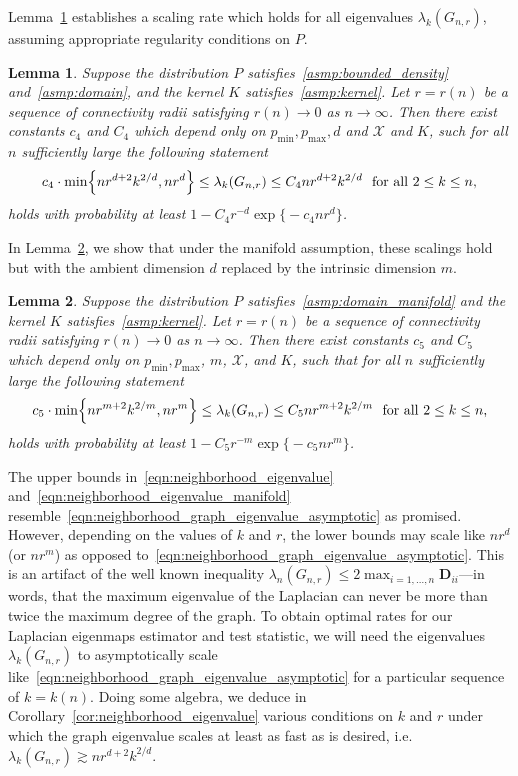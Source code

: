 \documentclass{article}
\newcommand{\1}{\mathbf{1}}
\newcommand{\Xset}{\mathcal{X}}
\theoremstyle{alden}
\theoremstyle{aldenthm}
\newtheorem{lemma}{Lemma}
\theoremstyle{definition}
\theoremstyle{remark}
\begin{document}
Lemma~\ref{lem:neighborhood_eigenvalue} establishes a scaling rate which holds for all eigenvalues $\lambda_{k}(G_{n,r})$, assuming appropriate regularity conditions on $P$.
\begin{lemma}
	\label{lem:neighborhood_eigenvalue}
	Suppose the distribution $P$ satisfies~\ref{asmp:bounded_density} and~\ref{asmp:domain}, and the kernel $K$ satisfies~\ref{asmp:kernel}. Let $r = r(n)$ be a sequence of connectivity radii satisfying $r(n) \to 0$ as $n \to \infty$. Then there exist constants $c_4$ and $C_4$ which depend only on $p_{\min}, p_{\max},d$ and $\Xset$ and $K$, such for all $n$ sufficiently large the following statement
	\begin{equation}
	\label{eqn:neighborhood_eigenvalue}
	c_4 \cdot \min\Bigl\{nr^{d + 2}k^{2/d}, nr^d\Bigr\} \leq \lambda_k(G_{n,r}) \leq C_4 nr^{d + 2}k^{2/d}~~\textrm{for all $2 \leq k \leq n$,}
	\end{equation}	
	holds with probability at least $1 - C_4 r^{-d} \exp\bigl\{- c_4 n r^d\bigr\}$.
\end{lemma}
In Lemma~\ref{lem:neighborhood_eigenvalue_manifold}, we show that under the manifold assumption, these scalings hold but with the ambient dimension $d$ replaced by the intrinsic dimension $m$.
\begin{lemma}
	\label{lem:neighborhood_eigenvalue_manifold}
	Suppose the distribution $P$ satisfies~\ref{asmp:domain_manifold} and the kernel $K$ satisfies~\ref{asmp:kernel}. Let $r = r(n)$ be a sequence of connectivity radii satisfying $r(n) \to 0$ as $n \to \infty$. Then there exist constants $c_5$ and $C_5$ which depend only on $p_{\min}, p_{\max}$, $m$, $\Xset$, and $K$, such that for all $n$ sufficiently large the following statement 
	\begin{equation}
	\label{eqn:neighborhood_eigenvalue_manifold}
	 c_5 \cdot \min\Bigl\{nr^{m + 2}k^{2/m}, nr^m\Bigr\} \leq \lambda_k(G_{n,r}) \leq C_5 nr^{m + 2}k^{2/m}~~\textrm{for all $2 \leq k \leq n$,}
	\end{equation}	
	holds with probability at least $1 - C_5 r^{-m} \exp\bigl\{- c_5 n r^m\bigr\}$.
\end{lemma}
The upper bounds in~\eqref{eqn:neighborhood_eigenvalue} and~\eqref{eqn:neighborhood_eigenvalue_manifold} resemble~\eqref{eqn:neighborhood_graph_eigenvalue_asymptotic} as promised. However,  depending on the values of $k$ and $r$, the lower bounds may scale like $nr^d$ (or $nr^m$) as opposed to~\eqref{eqn:neighborhood_graph_eigenvalue_asymptotic}. This is an artifact of the well known inequality $\lambda_n(G_{n,r}) \leq 2 \max_{i = 1,\ldots,n} \mathbf{D}_{ii} $---in words, that the maximum eigenvalue of the Laplacian can never be more than twice the maximum degree of the graph. To obtain optimal rates for our Laplacian eigenmaps estimator and test statistic, we will need the eigenvalues $\lambda_k(G_{n,r})$ to asymptotically scale like~\eqref{eqn:neighborhood_graph_eigenvalue_asymptotic} for a particular sequence of $k = k(n)$. Doing some algebra, we deduce in Corollary~\ref{cor:neighborhood_eigenvalue} various conditions on $k$ and $r$ under which the graph eigenvalue scales at least as fast as is desired, i.e. $\lambda_k(G_{n,r}) \gtrsim n r^{d + 2}k^{2/d}$. 
\end{document}
